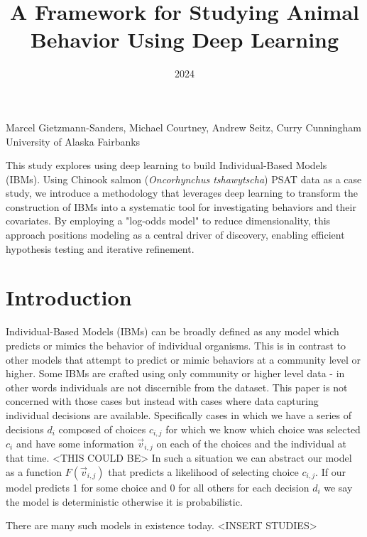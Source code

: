 \documentclass[11pt]{article}
\title{A Framework for Studying Animal Behavior Using Deep Learning}
\date{2024}
\makeatletter
\renewcommand{\maketitle}{
\begin{center}

\pagestyle{empty}

{\LARGE \bf \@title\par}
\vspace{1cm}

{\Large Marcel Gietzmann-Sanders, Michael Courtney, Andrew Seitz, Curry Cunningham}\\[1cm]

University of Alaska Fairbanks


\end{center}
}\makeatother
\makeatother
\begin{document}
\maketitle


\begin{center}
This study explores using deep learning to build Individual-Based Models (IBMs). Using Chinook salmon (\textit{Oncorhynchus tshawytscha}) PSAT data as a case study, we introduce a methodology that leverages deep learning to transform the construction of IBMs into a systematic tool for investigating behaviors and their covariates. By employing a "log-odds model" to reduce dimensionality, this approach positions modeling as a central driver of discovery, enabling efficient hypothesis testing and iterative refinement.
\end{center}



\section*{Introduction}

Individual-Based Models (IBMs) can be broadly defined as any model which predicts or mimics the behavior of individual organisms. This is in contrast to other models that attempt to predict or mimic behaviors at a community level or higher. Some IBMs are crafted using only community or higher level data - in other words individuals are not discernible from the dataset. This paper is not concerned with those cases but instead with cases where data capturing individual decisions are available. Specifically cases in which we have a series of decisions $d_i$ composed of choices $c_{i,j}$ for which we know which choice was selected $c_i$ and have some information $\vec{v}_{i,j}$ on each of the choices and the individual at that time. <THIS COULD BE> In such a situation we can abstract our model as a function $F(\vec{v}_{i,j})$ that predicts a likelihood of selecting choice $c_{i,j}$. If our model predicts 1 for some choice and 0 for all others for each decision $d_i$ we say the model is deterministic otherwise it is probabilistic. 

There are many such models in existence today. <INSERT STUDIES>
\end{document}
